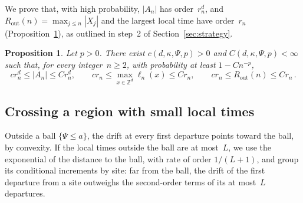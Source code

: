 \documentclass[11pt]{amsart}
\theoremstyle{plain}
\newtheorem{proposition}[theorem]{Proposition}
\theoremstyle{definition}
\newcommand{\Z}{\mathbb Z}
\newcommand{\drift}{\kappa}
\newcommand{\gauge}{\Psi}
\newcommand{\Rout}{R_{\mathrm{out}}}
\numberwithin{equation}{section}
\begin{document}
We prove that, with high probability, $|A_n|$ has order~$r_n^d$, and $\Rout(n)=\max_{j\leq n}|X_j|$ and the largest local time have order~$r_n$ (Proposition~\ref{prop:coarse}), as outlined in step~2 of Section~\ref{sec:strategy}.

\begin{proposition}\label{prop:coarse}
Let $p>0$. There exist $c(d,\drift,\gauge,p)>0$ and $C(d,\drift,\gauge,p)<\infty$ such that, for every integer~$n\geq2$, with probability at least $1-Cn^{-p}$,
\begin{equation*}
cr_n^d\leq|A_n|\leq Cr_n^d,\qquad
cr_n\leq\max_{x\in\Z^d}\ell_n(x)\leq Cr_n,\qquad
cr_n\leq\Rout(n)\leq Cr_n\, .
\end{equation*}
\end{proposition}

\subsection{Crossing a region with small local times}\label{sec:crossing}

Outside a ball $\{\gauge\leq a\}$, the drift at every first departure points toward the ball, by convexity. If the local times outside the ball are at most~$L$, we use the exponential of the distance to the ball, with rate of order $1/(L+1)$, and group its conditional increments by site: far from the ball, the drift of the first departure from a site outweighs the second-order terms of its at most~$L$ departures.
\end{document}
